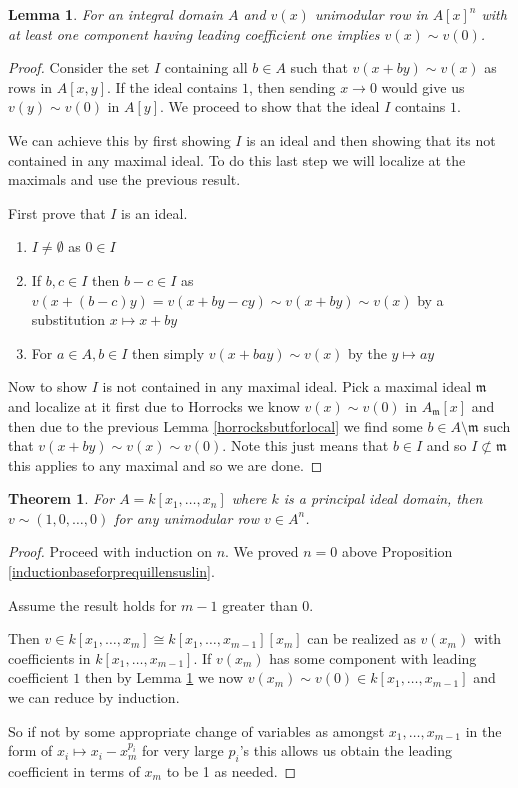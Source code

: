 \documentclass[12pt]{report}
\numberwithin{equation}{section}
\newcounter{dummy} \numberwithin{dummy}{section}
\newtheorem{theorem}[dummy]{Theorem}
\newtheorem{lemma}[dummy]{Lemma}
\begin{document}
	\begin{lemma}\label{horrocksbuteverything}
		For an integral domain $A$ and $v(x)$ unimodular row in $A[x]^n$ with at least one component having leading coefficient one implies $v(x) \sim v(0)$.
	\end{lemma}
	\begin{proof}
		Consider the set $I$ containing all $b \in A$ such that $v(x+by)\sim v(x)$ as rows in $A[x,y]$. If the ideal contains $1$, then sending $x \to 0$ would give us $v(y)\sim v(0) $ in $A[y].$ We proceed to show that the ideal $I$ contains $1$.
		
		We can achieve this by first showing $I$ is an ideal and then showing that its not contained in any maximal ideal.	To do this last step we will localize at the maximals and use the previous result.
		
		First prove that $I$ is an ideal.
		\begin{enumerate}
			\item $I \neq \emptyset $ as $0 \in I$
			\item If $b,c \in I$ then $b-c \in I$ as $v(x+(b-c)y)=v(x+by-cy) \sim v(x+by) \sim v(x)$ by a substitution $x \mapsto x+by$
			\item For $a \in A, b \in I$ then simply $v(x+bay) \sim v(x)$ by the $y \mapsto ay$
		\end{enumerate}
		
		Now to show $I$ is not contained in any maximal ideal. Pick a maximal ideal $\mathfrak m$ and localize at it first due to Horrocks we know $v(x) \sim v(0) $ in $A_{\mathfrak m} [x]$ and then due to the previous Lemma \ref{horrocksbutforlocal} we find some $b \in A\setminus \mathfrak m$ such that $v(x+by) \sim v(x) \sim v(0)$. Note this just means that $ b \in I$ and so $I\not \subset \mathfrak m$ this applies to any maximal and so we are done.  
	\end{proof}
	
	\begin{theorem}
		For $A=k[x_1, \dots, x_n]$ where $k $ is a principal ideal domain, then $v \sim (1,0,\dots, 0)$ for any unimodular row $v \in A^n$.
	\end{theorem}
	\begin{proof}
		Proceed with induction on $n$. We proved $n=0$ above Proposition \ref{inductionbaseforprequillensuslin}.
		
		Assume the result holds for $m-1$ greater than $0$.
		
		Then $v \in k[x_1, \dots, x_m] \cong k[x_1,\dots, x_{m-1}] [x_m]$ can be realized as $v(x_m) $ with coefficients in $k[x_1,\dots, x_{m-1}]$. If $v(x_m)$ has some component with leading coefficient $1$ then by Lemma \ref{horrocksbuteverything} we now $v(x_m) \sim v(0) \in k[x_1, \dots, x_{m-1}]$ and we can reduce by induction.
		
		So if not by some appropriate change of variables as amongst $x_1, \dots, x_{m-1}$ in the form of $x_i \mapsto x_i-x_m^{p_i}$ for very large $p_i$'s this allows us obtain the leading coefficient in terms of $x_m$ to be 1 as needed.
	\end{proof}
\end{document}
